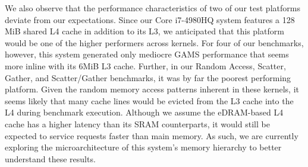 We also observe that the performance characteristics of two of our test platforms deviate from our expectations.
Since our Core i7-4980HQ system features a 128 MiB shared L4 cache in addition to its L3, we anticipated that this platform would be one of the higher performers across kernels.
For four of our benchmarks, however, this system generated only mediocre GAMS performance that seems more inline with its 6MiB L3 cache.
Further, in our Random Access, Scatter, Gather, and Scatter/Gather benchmarks, it was by far the poorest performing platform.
Given the random memory access patterns inherent in these kernels, it seems likely that many cache lines would be evicted from the L3 cache into the L4 during benchmark execution.
Although we assume the eDRAM-based L4 cache has a higher latency than its SRAM counterparts, it would still be expected to service requests faster than main memory.
As such, we are currently exploring the microarchitecture of this system's memory hierarchy to better understand these results.

